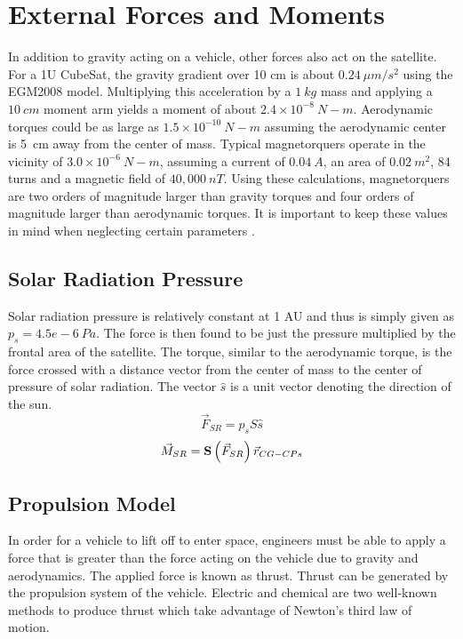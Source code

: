 
\section{External Forces and Moments}

In addition to gravity acting on a vehicle, other forces also act
on the satellite. For a 1U CubeSat, the gravity gradient over 10 cm is about
$0.24~\mu m/s^2$ using the EGM2008 model. Multiplying this 
acceleration by a $1~kg$ mass and applying a $10~cm$ moment arm yields
a moment of about $2.4 \times 10^{-8}~N-m$. Aerodynamic torques could
be as large as $1.5 \times 10^{-10}~N-m$ assuming the aerodynamic
center is 5~cm away from the center of mass. Typical magnetorquers operate
in the vicinity of $3.0 \times 10^{-6}~N-m$, assuming a current of $0.04~A$, an area of
$0.02~m^2$, 84 turns and a magnetic field of $40,000~nT$. Using
these calculations, magnetorquers are two orders of magnitude
larger than gravity torques and four orders of magnitude larger than
aerodynamic torques. It is important to keep these values in mind when
neglecting certain parameters
\cite{Radiation,AndersonD,Density_Model}.

\subsection{Solar Radiation Pressure}

Solar radiation pressure is relatively constant at 1 AU and thus is
simply given as $p_s=4.5e-6~Pa$. The force is then found to be just
the pressure multiplied by the frontal area of the satellite. The
torque, similar to the aerodynamic torque, is the force crossed with a
distance vector from the center of mass to the center of pressure of
solar radiation. The vector $\hat{s}$ is a unit vector denoting the
direction of the sun.
\begin{equation}
  \vec{F}_{SR} = p_s S \hat{s}
  \end{equation}
\begin{equation}
    \vec{M}_{SR} = {\bf S} \left( \vec{F}_{SR} \right) \vec{r}_{CG-CPs}
\end{equation}

\subsection{Propulsion Model}

In order for a vehicle to lift off to enter space, engineers must be
able to apply a force that is greater than the force acting on the
vehicle due to gravity and aerodynamics.  The applied force is known
as thrust. Thrust can be generated by the propulsion system of the
vehicle. Electric and chemical are two well-known methods to produce
thrust which take advantage of Newton’s third law of motion.

